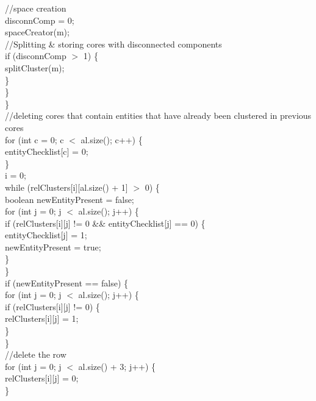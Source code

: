 \begin{ttfamily   }
\begin{scriptsize}
                \noindent//space creation\\
                disconnComp = 0;\\
                spaceCreator(m);\\

                \noindent//Splitting \& storing cores with disconnected components\\
                if (disconnComp $>$ 1) \{\\
                    splitCluster(m);\\
                \}\\
            \}\\
        \}\\

        \noindent//deleting cores that contain entities that have already been clustered in previous cores\\
        \noindent for (int c = 0; c $<$ al.size(); c++) \{\\
            entityChecklist[c] = 0;\\
        \}\\
        i = 0;\\
        while (relClusters[i][al.size() + 1] $>$ 0) \{\\
            boolean newEntityPresent = false;\\
            \noindent for (int j = 0;   j $<$ al.size();   j++) \{\\
                if (relClusters[i][j] != 0 \&\& entityChecklist[j] == 0) \{\\
                    entityChecklist[j] = 1;\\
                    newEntityPresent = true;\\
                \}\\
            \}\\
            if (newEntityPresent == false) \{\\
                \noindent for (int j = 0;   j $<$ al.size();   j++) \{\\
                    if (relClusters[i][j] != 0) \{\\
                        relClusters[i][j] = 1;\\
                    \}\\
                \}\\
                
	\noindent//delete the row\\
                \noindent for (int j = 0;   j $<$ al.size() + 3;   j++) \{\\
                    relClusters[i][j] = 0;\\
                \}\\
                

\end{scriptsize}
\end{ttfamily   }
